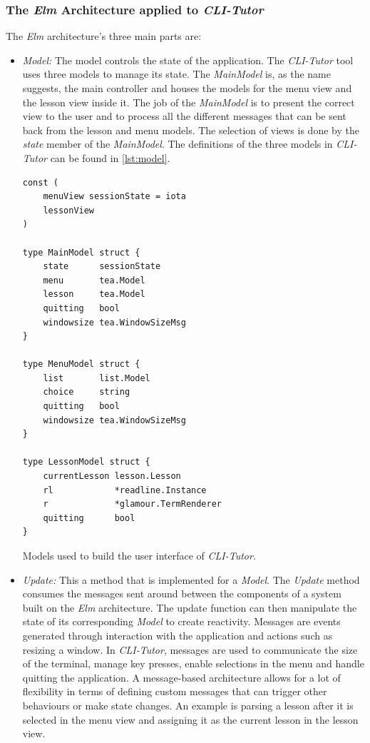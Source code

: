 \subsubsection{The \textit{Elm} Architecture applied to \textit{CLI-Tutor}} 

The \textit{Elm} architecture's three main parts are:

\begin{itemize}
    \item \textit{Model:} The model controls the state of the application. The 
        \textit{CLI-Tutor} tool uses three models to manage its state. The
        \textit{MainModel} is, as the name suggests, the main controller and
        houses the models for the menu view and the lesson view inside it. The
        job of the \textit{MainModel} is to present the correct view to the
        user and to process all the different messages that can be sent back
        from the lesson and menu models. The selection of views is done by the \textit{state} member of the \textit{MainModel}.  The definitions of the three models in \textit{CLI-Tutor} can be found in \autoref{lst:model}.

\begin{listing}
\begin{verbatim}
const (
	menuView sessionState = iota
	lessonView
)

type MainModel struct {
	state      sessionState
	menu       tea.Model
	lesson     tea.Model
	quitting   bool
	windowsize tea.WindowSizeMsg
}

type MenuModel struct {
	list       list.Model
	choice     string
	quitting   bool
	windowsize tea.WindowSizeMsg
}

type LessonModel struct {
	currentLesson lesson.Lesson
	rl            *readline.Instance
	r             *glamour.TermRenderer
	quitting      bool
}
\end{verbatim}
    \caption{Models used to build the user interface of \textit{CLI-Tutor}.}
    \label{lst:model}
\end{listing}

\item \textit{Update:} This a method that is implemented for a \textit{Model}. The
    \textit{Update} method consumes the messages sent around between the
    components of a system built on the \textit{Elm} architecture. The update
    function can then manipulate the state of its corresponding \textit{Model} to create
    reactivity. Messages are events generated through interaction with the
    application and actions such as resizing a window. In \textit{CLI-Tutor},
    messages are used to communicate the size of the terminal, manage key
    presses, enable selections in the menu and handle quitting the application.
    A message-based architecture allows for a lot of flexibility in terms of
    defining custom messages that can trigger other behaviours or make state
    changes. An example is parsing a lesson after it is selected in the menu
    view and assigning it as the current lesson in the lesson view.


\end{itemize}
